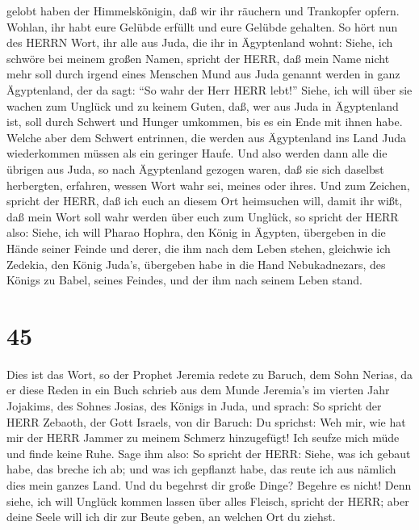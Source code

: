 gelobt haben der Himmelskönigin, daß wir ihr räuchern und Trankopfer
opfern. Wohlan, ihr habt eure Gelübde erfüllt und eure Gelübde gehalten.
 So hört nun des HERRN Wort, ihr alle aus Juda, die ihr in
Ägyptenland wohnt: Siehe, ich schwöre bei meinem großen Namen, spricht
der HERR, daß mein Name nicht mehr soll durch irgend eines Menschen Mund
aus Juda genannt werden in ganz Ägyptenland, der da sagt: ``So wahr der
Herr HERR lebt!''  Siehe, ich will über sie wachen zum
Unglück und zu keinem Guten, daß, wer aus Juda in Ägyptenland ist, soll
durch Schwert und Hunger umkommen, bis es ein Ende mit ihnen habe.
 Welche aber dem Schwert entrinnen, die werden aus
Ägyptenland ins Land Juda wiederkommen müssen als ein geringer Haufe.
Und also werden dann alle die übrigen aus Juda, so nach Ägyptenland
gezogen waren, daß sie sich daselbst herbergten, erfahren, wessen Wort
wahr sei, meines oder ihres.  Und zum Zeichen, spricht der
HERR, daß ich euch an diesem Ort heimsuchen will, damit ihr wißt, daß
mein Wort soll wahr werden über euch zum Unglück,  so
spricht der HERR also: Siehe, ich will Pharao Hophra, den König in
Ägypten, übergeben in die Hände seiner Feinde und derer, die ihm nach
dem Leben stehen, gleichwie ich Zedekia, den König Juda's, übergeben
habe in die Hand Nebukadnezars, des Königs zu Babel, seines Feindes, und
der ihm nach seinem Leben stand.

\hypertarget{section-44}{%
\section{45}\label{section-44}}

 Dies ist das Wort, so der Prophet Jeremia redete zu Baruch,
dem Sohn Nerias, da er diese Reden in ein Buch schrieb aus dem Munde
Jeremia's im vierten Jahr Jojakims, des Sohnes Josias, des Königs in
Juda, und sprach:  So spricht der HERR Zebaoth, der Gott
Israels, von dir Baruch:  Du sprichst: Weh mir, wie hat mir
der HERR Jammer zu meinem Schmerz hinzugefügt! Ich seufze mich müde und
finde keine Ruhe.  Sage ihm also: So spricht der HERR:
Siehe, was ich gebaut habe, das breche ich ab; und was ich gepflanzt
habe, das reute ich aus nämlich dies mein ganzes Land.  Und
du begehrst dir große Dinge? Begehre es nicht! Denn siehe, ich will
Unglück kommen lassen über alles Fleisch, spricht der HERR; aber deine
Seele will ich dir zur Beute geben, an welchen Ort du ziehst.

